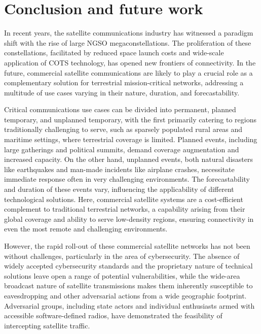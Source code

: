 \documentclass[english, 12pt, a4paper, elec, utf8, a-1b, online]{aaltothesis}
\begin{document}
\section{Conclusion and future work}

In recent years, the satellite communications industry has witnessed a paradigm shift with the rise of large NGSO megaconstellations.
The proliferation of these constellations, facilitated by reduced space launch costs and wide-scale application of COTS technology, has opened new frontiers of connectivity.
In the future, commercial satellite communications are likely to play a crucial role as a complementary solution for terrestrial mission-critical networks, addressing a multitude of use cases varying in their nature, duration, and forecastability.

Critical communications use cases can be divided into permanent, planned temporary, and unplanned temporary, with the first primarily catering to regions traditionally challenging to serve, such as sparsely populated rural areas and maritime settings, where terrestrial coverage is limited. Planned events, including large gatherings and political summits, demand coverage augmentation and increased capacity. On the other hand, unplanned events, both natural disasters like earthquakes and man-made incidents like airplane crashes, necessitate immediate response often in very challenging environments. The forecastability and duration of these events vary, influencing the applicability of different technological solutions. Here, commercial satellite systems are a cost-efficient complement to traditional terrestrial networks, a capability arising from their global coverage and ability to serve low-density regions, ensuring connectivity in even the most remote and challenging environments.

However, the rapid roll-out of these commercial satellite networks has not been without challenges, particularly in the area of cybersecurity.
The absence of widely accepted cybersecurity standards and the proprietary nature of technical solutions leave open a range of potential vulnerabilities, while the wide-area broadcast nature of satellite transmissions makes them inherently susceptible to eavesdropping and other adversarial actions from a wide geographic footprint.
Adversarial groups, including state actors and individual enthusiasts armed with accessible software-defined radios, have demonstrated the feasibility of intercepting satellite traffic.
\end{document}

